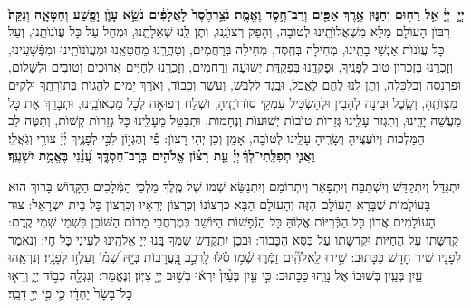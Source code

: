 \documentclass[twoside, openany, parskip=half, 11pt]{book}
\begin{document}


\pesicha

\\
 \textbf{יְיָ֣  יְיָ֔ אֵ֥ל רַח֖וּם וְחַנּ֑וּן אֶ֥רֶךְ אַפַּ֖יִם וְרַב־חֶ֥סֶד וֶאֱמֶֽת׃ נֹצֵ֥רחֶ֙סֶד֙ לָאֲלָפִ֔ים נֹשֵׂ֥א עָוֺ֛ן וָפֶ֖שַׁע וְחַטָּאָ֑ה וְנַקֵּה֙׃}
\\
רִבּוֺן הָעוׂלָם מַלֵּא מִשְׁאֲלוׂתֵֽינוּ לְטוׂבָה, וְהָפֵק רְצוׂנֵֽנוּ, וְתֶן לָֽנוּ שְׁאֵלָתְֵנוּ, וּמְחַל עַל כָּל עֲוׂנוׂתֵֽנוּ, וְעַל כָּל עֲוׂנוׂת אַנְשֵׁי בָתֵּֽינוּ, מְחִילָה בְּחֶֽסֶד, מְחִילָה בּֽרַחֲמִים,  וְטַהֲרֵֽנוּ מֵחֲטָאֵֽנוּ וּמֵעֲוׂנוׂתֵֽינוּ וּמִפְּֿשָׁעֵֽינוּ, וְזָכְרֵנוּ בְּזִכְרוׂן טוׂב לְפָנֶֽיךָ, וּפָקְדֵֽנוּ בִּפְקֻדַּת יְשׁוּעָה וְרַחֲמִים, וְזָכְרֵֽנוּ לְחַיִּים אֲרוּכִים וְטוׂבִים וּלְשָׁלוׂם, וּפַרְנָסָה וְכַלְכָּלָה, וְתֶן לָֽנוּ לֶֽחֶם לֶאֱכׂל, וּבֶֽגֶד לִלְבּׂשׁ, וְעׂשֶׁר וְכָבוׂד, וְאׂרֶךְ יָמִים לַהֲגוׂת בְּתוׂרָתֶֽךָ וּלְקַיֵּם מִצְוׂתֶֽהָ, וְשֵֽׂכֶל וּבִינָה לְהָבִין וּלְהַשְׂכִּיל עִמְקֵי סוׂדוׂתֶֽיהָ, וּשְׁלַח רְפוּאָה לְכָל מַכְאוׂבֵֽינוּ, וּתְבָרֵךְ אֶת כָּל מַעֲשֵׁה יָדֵֽינוּ, וְתִגְזׂר עָלֵֽינוּ גְּזֵרוׂת טוׂבוׂת יְשׁוּעוׂת וְנֶחָמוׂת, וּתְבַטֵּל מֵעָלֵֽינוּ כָּל גְּזֵרוׂת קָשׁוׂת, וְתַטֶּה לֵב הַמַּלְכוּת וְיוׂעֲצֶֽיהָ וְשָׂרֶֽיהָ עָלֵֽינוּ לְטוׂבָה, אָמֵן וְכֵן יְהִי רָצוׂן: פִ֡י וְהֶגְי֣וֹן לִבִּ֣י לְפָנֶ֑יךָ יְ֜יָ֗ צוּרִ֥י וְגֹֽאֲלִֽי׃\\
\textbf{וַאֲנִ֤י תְפִלָּֽתִי־לְךָ֨ יְיָ֡ עֵ֤ת רָצ֗וֹן אֱלֹהִ֥ים בְּרׇב־חַסְדֶּ֑ךָ עֲ֝נֵ֗נִי בֶּאֱמֶ֥ת יִשְׁעֶֽךָ׃} 

\gadlu

\label{al hakol}
יִתְגַּדַּל וְיִתְקַדַּשׁ וְיִשְׁתַּבַּח וְיִתְפָּאַר וְיִתְרוֹמַם וְיִתְנַשֵּׂא שְׁמוֹ שֶׁל מֶֽלֶךְ מַלְכֵי הַמְּֿלָכִים הַקְָּדוֹשׁ בָּרוּךְ הוּא בָּעוֹלָמוֹת שֶׁבָּרָא הָעוֹלָם הַזֶּה וְהָעוֹלָם הַבָּא כִּרְצוֹנוֹ וְכִרְצוֹן יְרֵאָיו וְכִרְצוֹן כָּל בֵּית יִשְׂרָאֵל: צוּר הָעוֹלָמִים אֲדוֹן כָּל הַבְּֿרִיּוֹת אֱלֽוֹהַּ כָּל הַנְּֿפָשׁוֹת הַיּוֹשֵׁב בְּמֶרְחֲבֵי מָרוֹם הַשּׁוֹכֵן בִּשְׁמֵי שְׁמֵי קֶֽדֶם: קְדֻשָּׁתוֹ עַל הַחַיּוֹת וּקְדֻשָּׁתוֹ עַל כִּסֵּא הַכָּבוֹד: וּבְכֵן יִתְקַדַּשׁ שִׁמְךָ בָּֽנוּ יְיָ אֱלֹהֵֽינוּ לְעֵינֵי כָּל חָי: וְנֹאמַר לְפָנָיו שִׁיר חָדָשׁ כַּכָּתוּב:
 שִׁ֥ירוּ   לֵֽאלֹהִֽ֘ים זַמְּֿר֢וּ שְׁ֫מ֥וֹ סֹ֡לּוּ לָֽרֹכֵ֣ב בָּֽ֭עֲרָבוֹת בְּיָ֥הּ שְׁ֝מ֗וֹ וְעִלְז֥וּ לְפָנָֽיו׃ וְנִרְאֵֽהוּ עַֽיִן בְּעַֽיִן בְּשׁוּבוֹ אֶל נָוֵֽהוּ כַּכָּתוּב:
  כִּ֣י עַ֤יִן בְּעַ֨יִן֙ יִרְא֔וּ בְּשׁ֥וּב יְיָ֖ צִיּֽוֹן׃ וְנֶאֱמַר:
   וְנִגְלָ֖ה כְּב֣וֹד יְיָ֑ וְרָא֤וּ כָל־בָּשָׂר֙ יַחְדָּ֔ו כִּ֛י פִּ֥י יְיָ֖ דִּבֵּֽר׃
\end{document}
